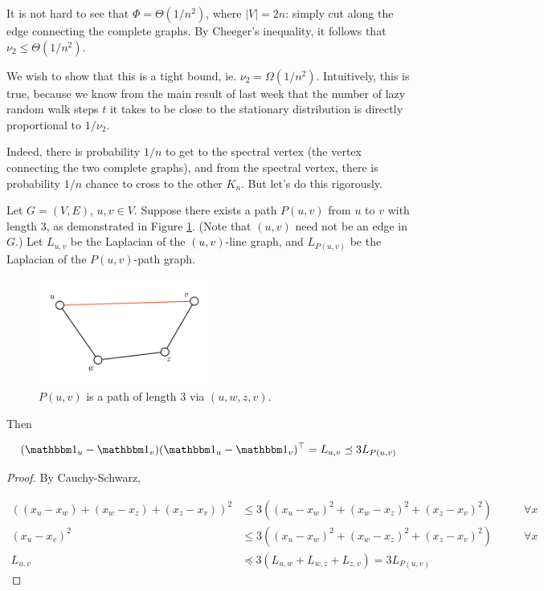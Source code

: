 \documentclass[11pt]{article}
\begin{document}
It is not hard to see that $\Phi = \Theta(1 / n^2)$, where $|V| = 2n$: simply
cut along the edge connecting the complete graphs. By Cheeger's inequality, it
follows that $\nu_2 \le \Theta(1 / n^2)$.

We wish to show that this is a tight bound, ie. $\nu_2 = \Omega(1 / n^2)$.
Intuitively, this is true, because we know from the main result of last week
that the number of lazy random walk steps $t$ it takes to be close to the
stationary distribution is directly proportional to $1 / \nu_2$. 

Indeed, there is probability $1 / n$ to get to the spectral vertex (the vertex
connecting the two complete graphs), and from the spectral vertex, there is
probability $1 / n$ chance to cross to the other $K_n$. But let's do this
rigorously.

\begin{lemma}
  Let $G = (V, E)$, $u, v \in V$. Suppose there exists a path $P(u, v)$ from $u$
  to $v$ with length $3$, as demonstrated in Figure \ref{path_example}. (Note
  that $(u, v)$ need not be an edge in $G$.) Let $L_{u, v}$ be the Laplacian of
  the $(u, v)$-line graph, and $L_{P(u, v)}$ be the Laplacian of the $P(u,
  v)$-path graph.

  \begin{figure}
    \centering
    \includegraphics[width=0.5\textwidth]{images/path_example.png}
    \caption{$P(u, v)$ is a path of length $3$ via $(u, w, z,
      v)$.\label{path_example}}
  \end{figure}

  Then 

  \[ (\ones_u - \ones_v)(\ones_u - \ones_v)^{\top} = L_{u, v} \preceq 3 L_{P(u,
  v)} \]
\end{lemma}

\begin{proof}
  By Cauchy-Schwarz,

  \begin{align*}
    ((x_u - x_w) + (x_w - x_z) + (x_z - x_v))^2 &\le 3 ((x_u - x_w)^2 +
    (x_w - x_z)^2 + (x_z - x_v)^2) \qquad &\forall x \\
    (x_u - x_v)^2 &\le 3 ((x_u - x_w)^2 + (x_w - x_z)^2 + (x_z - x_v)^2) \qquad
    &\forall x \\
    L_{u, v} &\preceq 3 (L_{u, w} + L_{w, z} + L_{z, v}) = 3 L_{P(u, v)}
  \end{align*}
\end{proof}
\end{document}

